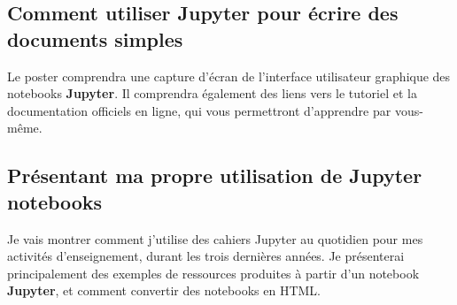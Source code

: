 \documentclass[runningheads]{llncs}
\newcommand{\Jupyter}{\textbf{Jupyter}}
\begin{document}
\subsection*{Comment utiliser \Jupyter{} pour écrire des documents simples}

Le poster comprendra une capture d'écran de l'interface utilisateur graphique des notebooks \Jupyter{}.
Il comprendra également des liens vers le tutoriel et la documentation officiels en ligne, qui vous permettront d'apprendre par vous-même.


\subsection*{Présentant ma propre utilisation de Jupyter{} notebooks}

Je vais montrer comment j'utilise des cahiers Jupyter au quotidien pour mes activités d'enseignement, durant les trois dernières années.
Je présenterai principalement des exemples de ressources produites à partir d'un notebook \Jupyter{}, et comment convertir des notebooks en HTML.
\end{document}
